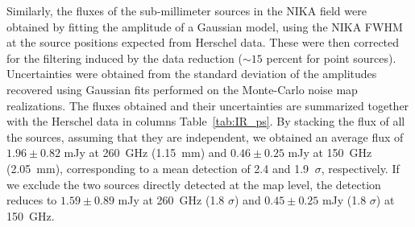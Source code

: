 \documentclass[traditabstract]{aa}
\begin{document}
Similarly, the fluxes of the sub-millimeter sources in the NIKA field were obtained by fitting the amplitude of a Gaussian model, using the NIKA FWHM at the source positions expected from Herschel data. These were then corrected for the filtering induced by the data reduction ($\sim15$ percent for point sources). Uncertainties were obtained from the standard deviation of the amplitudes recovered using Gaussian fits performed on the Monte-Carlo noise map realizations. The fluxes obtained and their uncertainties are summarized together with the Herschel data in columns Table~\ref{tab:IR_ps}. By stacking the flux of all the sources, assuming that they are independent, we obtained an average flux of $1.96 \pm 0.82$ mJy at 260~GHz (1.15~mm) and $0.46 \pm 0.25$ mJy at 150~GHz (2.05~mm), corresponding to a mean detection of 2.4 and 1.9 $ \ \sigma$, respectively. If we exclude the two sources directly detected at the map level, the detection reduces to $1.59 \pm 0.89$ mJy at 260~GHz (1.8 $\sigma$) and $0.45 \pm 0.25$ mJy (1.8 $\sigma$) at 150~GHz.
\end{document}
